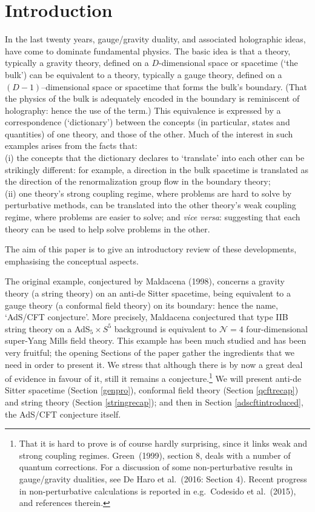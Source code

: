 \documentclass[12pt]{article}
\renewcommand{\^}[1]{\hat{#1}}
\begin{document}
\newpage
\pagestyle{plain}

\tableofcontents

\newpage

\section{Introduction}\label{intro}
In the last twenty years, gauge/gravity duality, and associated holographic ideas, have come to dominate fundamental physics. The basic idea is that a theory, typically a gravity theory,  defined on a $D$-dimensional space or spacetime (`the bulk') can  be equivalent to a theory, typically a gauge theory, defined on a $(D-1)$--dimensional space or spacetime that forms the bulk's boundary. (That the physics of the bulk is adequately encoded in the boundary is reminiscent of holography: hence the use of the term.)  This equivalence is expressed by a correspondence (`dictionary') between the concepts (in particular, states and quantities) of one theory, and those of the other. Much of the interest in such examples arises from the facts that:\\
\indent (i) the concepts that the dictionary declares to `translate' into each other can be strikingly different: for example, a direction in the bulk spacetime is translated as the direction of the renormalization group flow in the boundary theory;\\
\indent (ii)  one theory's strong coupling regime, where problems are hard to solve by perturbative methods, can be translated into the other theory's weak coupling regime, where problems are easier to solve; and {\em vice versa}: suggesting that each theory can be used to help solve problems in the other.   

The aim of this paper is to give an introductory review of these developments, emphasising the conceptual aspects.

 The original example, conjectured by Maldacena (1998), concerns a gravity theory (a string theory) on an anti-de Sitter spacetime, being equivalent to a gauge theory (a conformal field theory) on its boundary: hence the name, `AdS/CFT conjecture'. More precisely, Maldacena conjectured that type IIB string theory on a AdS$_5\times S^5$ background is equivalent to  $\mathcal{N}=4$ four-dimensional super-Yang Mills field theory. This example has been much studied and has been very fruitful; the opening Sections of the paper gather the  ingredients that we need in order to present it. We stress that although there is by now a great deal of evidence in favour of it, still it remains a conjecture.\footnote{That it is hard to prove is of course hardly surprising, since it links weak and strong coupling regimes. Green~(1999), section 8, deals with a number of quantum corrections. For a discussion of some non-perturbative results in gauge/gravity dualities, see De Haro et al.~(2016: Section 4). Recent progress in non-perturbative calculations is reported in e.g.~Codesido et al.~(2015), and references therein.} We will present anti-de Sitter spacetime (Section \ref{genpro}), conformal field theory (Section \ref{qcftrecap}) and string theory (Section \ref{stringrecap}); and then in Section \ref{adscftintroduced}, the  AdS/CFT conjecture itself. 
 
\end{document}
